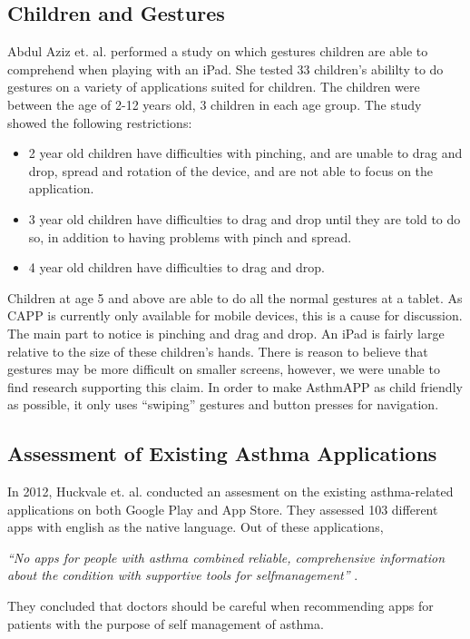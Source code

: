 \subsection{Children and Gestures}

Abdul Aziz et. al. \cite{aziz2013children} performed a study on which gestures children are able to comprehend when playing with an iPad. She tested 33 children's abililty to do gestures on a variety of applications suited for children. The children were between the age of 2-12 years old, 3 children in each age group. The study showed the following restrictions:

\begin{itemize}
  \item 2 year old children have difficulties with pinching, and are unable to drag and drop, spread and rotation of the device, and are not able to focus on the application. 
  \item 3 year old children have difficulties to drag and drop until they are told to do so, in addition to having problems with pinch and spread. 
  \item 4 year old children have difficulties to drag and drop. 
\end{itemize}
Children at age 5 and above are able to do all the normal gestures at a tablet. As CAPP is currently only available for mobile devices, this is a cause for discussion. The main part to notice is pinching and drag and drop. An iPad is fairly large relative to the size of these children's hands. There is reason to believe that gestures may be more difficult on smaller screens, however, we were unable to find research supporting this claim. In order to make AsthmAPP as child friendly as possible, it only uses ``swiping'' gestures and button presses for navigation.

\subsection{Assessment of Existing Asthma Applications}
In 2012, Huckvale et. al. \cite{huckvale2012apps} conducted an assesment on the existing asthma-related applications on both Google Play and App Store. They assessed 103 different apps with english as the native language. Out of these applications, 


\emph{``No apps for people with asthma combined reliable, comprehensive information about the condition with supportive tools for self­management''} \cite{huckvale2012apps}. 


They concluded that doctors should be careful when recommending apps for patients with the purpose of self management of asthma.